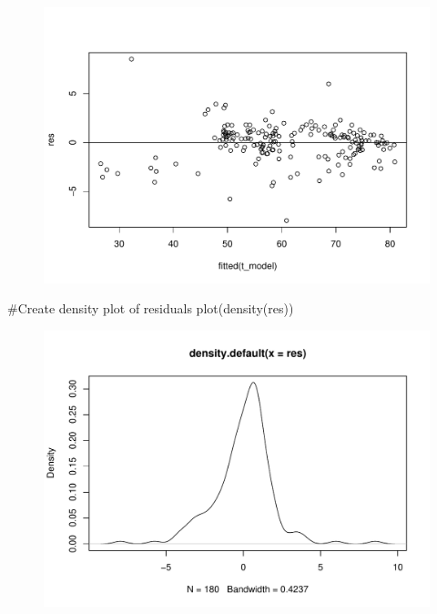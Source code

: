 \documentclass[
  letterpaper,
  DIV=11,
  numbers=noendperiod]{scrartcl}
\newenvironment{Shaded}{\begin{snugshade}}{\end{snugshade}}
\newcommand{\CommentTok}[1]{\textcolor[rgb]{0.37,0.37,0.37}{#1}}
\newcommand{\FunctionTok}[1]{\textcolor[rgb]{0.28,0.35,0.67}{#1}}
\newcommand{\NormalTok}[1]{\textcolor[rgb]{0.00,0.23,0.31}{#1}}
\begin{document}
\begin{figure}[H]

{\centering \includegraphics{THP_CEAC_20231102_files/figure-pdf/data_plot_stat_rh-1.pdf}

}

\end{figure}

\begin{Shaded}
\begin{Highlighting}[]
\CommentTok{\#Create density plot of residuals}
\FunctionTok{plot}\NormalTok{(}\FunctionTok{density}\NormalTok{(res))}
\end{Highlighting}
\end{Shaded}

\begin{figure}[H]

{\centering \includegraphics{THP_CEAC_20231102_files/figure-pdf/data_plot_stat_rh-2.pdf}

}

\end{figure}
\end{document}
